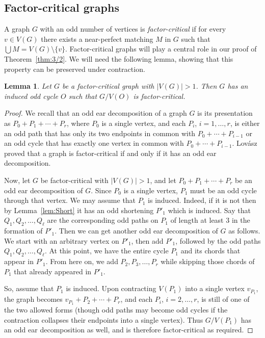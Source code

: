 \documentclass{article}
\newtheorem{lemma}[theorem]{Lemma}
\theoremstyle{definition}
\begin{document}
\subsection{Factor-critical graphs}
A graph $G$ with an odd number of vertices is \emph{factor-critical} if for every $v \in V(G)$ there exists a near-perfect matching $M$ in $G$ such that $\bigcup M = V(G) \setminus \{v\}$. Factor-critical graphs will play a central role in our proof of Theorem~\ref{thm:3/2}. We will need the following lemma, showing that this property can be preserved under contraction.
\begin{lemma} \label{lem:Ind}
Let $G$ be a factor-critical graph with $|V(G)| > 1$. Then $G$ has an induced odd cycle $O$ such that $G/V(O)$ is factor-critical.
\end{lemma}
\begin{proof} We recall that an odd ear decomposition of a graph $G$ is its presentation as $P_0 + P_1 + \cdots + P_r$, where $P_0$ is a single vertex, and each $P_i$, $i=1, \ldots , r$, is either an odd path that has only its two endpoints in common with $P_0 + \cdots + P_{i-1}$ or an odd cycle that has exactly one vertex in common with $P_0 + \cdots + P_{i-1}$. Lov\'asz~\cite{Lo2} proved that a graph is factor-critical if and only if it has an odd ear decomposition.

Now, let $G$ be factor-critical with $|V(G)| > 1$, and let $P_0 + P_1 + \cdots + P_r$ be an odd ear decomposition of $G$. Since $P_0$ is a single vertex, $P_1$ must be an odd cycle through that vertex. We may assume that $P_1$ is induced. Indeed, if it is not then by Lemma~\ref{lem:Short} it has an odd shortening $P'_1$ which is induced. Say that $Q_1, Q_2, \ldots , Q_{\ell}$ are the corresponding odd paths on $P_1$ of length at least $3$ in the formation of $P'_1$. Then we can get another odd ear decomposition of $G$ as follows. We start with an arbitrary vertex on $P'_1$, then add $P'_1$, followed by the odd paths $Q_1, Q_2, \ldots , Q_{\ell}$. At this point, we have the entire cycle $P_1$ and its chords that appear in $P'_1$. From here on, we add $P_2, P_3, \ldots , P_r$ while skipping those chords of $P_1$ that already appeared in $P'_1$.

So, assume that $P_1$ is induced. Upon contracting $V(P_1)$ into a single vertex $v_{P_1}$, the graph becomes $v_{P_1} + P_2 + \cdots + P_r$, and each $P_i$, $i=2, \ldots , r$, is still of one of the two allowed forms (though odd paths may become odd cycles if the contraction collapses their endpoints into a single vertex). Thus $G/V(P_1)$ has an odd ear decomposition as well, and is therefore factor-critical as required.
\end{proof}
\end{document}
